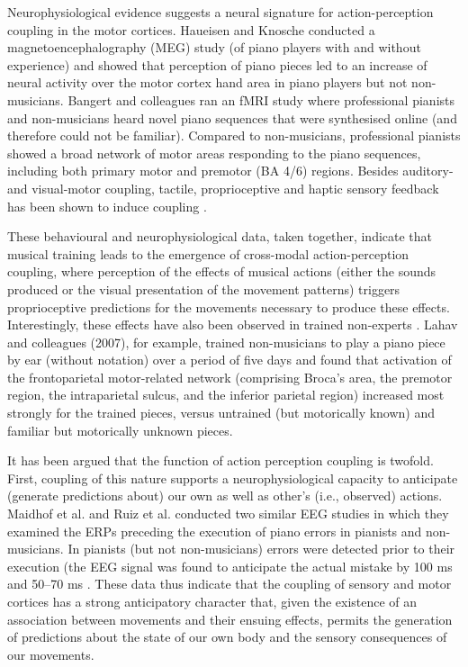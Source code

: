 \begin{CJK}{UTF8}{gbsn}
Neurophysiological evidence suggests a neural signature for action-perception coupling in the motor cortices.  Haueisen and Knosche \citep{Haueisen2001} conducted a magnetoencephalography (MEG) study (of piano players with and without experience) and showed that perception of piano pieces led to an increase of neural activity over the motor cortex hand area in piano players but not non-musicians.  Bangert and colleagues \textcite{Bangert2006} ran an fMRI study where professional pianists and non-musicians heard novel piano sequences that were synthesised online (and therefore could not be familiar).  Compared to non-musicians, professional pianists showed a broad network of motor areas responding to the piano sequences, including both primary motor and premotor (BA 4/6) regions.  Besides auditory- and visual-motor coupling, tactile, proprioceptive and haptic sensory feedback has been shown to induce coupling \citep{Schulz2003,Kuchenbuch2014}.

These behavioural and neurophysiological data, taken together, indicate that musical training leads to the emergence of cross-modal action-perception coupling, where perception of the effects of musical actions (either the sounds produced or the visual presentation of the movement patterns) triggers proprioceptive predictions for the movements necessary to produce these effects. Interestingly, these effects have also been observed in trained non-experts \citep{Bangert2003,Lahav2007}.  Lahav and colleagues (2007), for example, trained non-musicians to play a piano piece by ear (without notation) over a period of five days and found that activation of the frontoparietal motor-related network (comprising Broca’s area, the premotor region, the intraparietal sulcus, and the inferior parietal region) increased most strongly for the trained pieces, versus untrained (but motorically known) and familiar but motorically unknown pieces.

It has been argued that the function of action perception coupling is twofold.  First, coupling of this nature supports a neurophysiological capacity to anticipate (generate predictions about) our own as well as other's  (i.e., observed) actions.  Maidhof et al. \textcite{Maidhof2009} and Ruiz et al. \textcite{Ruiz2009} conducted two similar EEG studies in which they examined the ERPs preceding the execution of piano errors in pianists and non-musicians.  In pianists (but not non-musicians) errors were detected prior to their execution (the EEG signal was found to anticipate the actual mistake by 100 ms \citep{Maidhof2009} and 50–70 ms \citep{Ruiz009}.  These data thus indicate that the coupling of sensory and motor cortices has a strong anticipatory character that, given the existence of an association between movements and their ensuing effects, permits the generation of predictions about the state of our own body and the sensory consequences of our movements.


\end{CJK}
